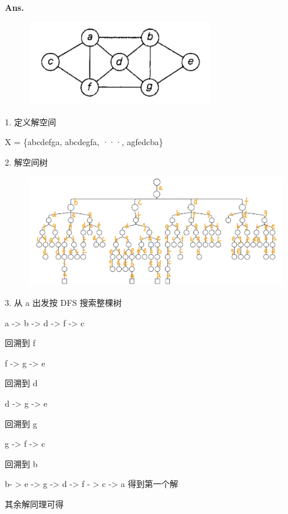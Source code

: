 \documentclass[12pt, a4paper, UTF8, fontset=windows]{ctexbook}
\newenvironment{solution}{\par\noindent\textbf{Ans.}}{\par}
\begin{document}
\begin{solution}
    \begin{figure}[h]
        \centering
        \includegraphics[width=8cm]{../../src/images/hw3-Q1.png}
    \end{figure}


    \vspace{2mm}  %

    1. 定义解空间
    
    X = \{abcdefga, abcdegfa, ···, agfedcba\}

    2. 解空间树
    \begin{figure}[h]
        \centering
        \includegraphics[width=15cm]{../../src/images/hw3-Q1-tree.jpg}
    \end{figure}

    3. 从 a 出发按 DFS 搜索整棵树

    a -> b -> d -> f -> c

    回溯到 f

    f -> g -> e

    回溯到 d

    d -> g -> e

    回溯到 g

    g -> f -> c

    回溯到 b


    b- > e -> g -> d -> f - > c -> a 得到第一个解

    其余解同理可得
    
    
\end{solution}

\newpage
\end{document}
